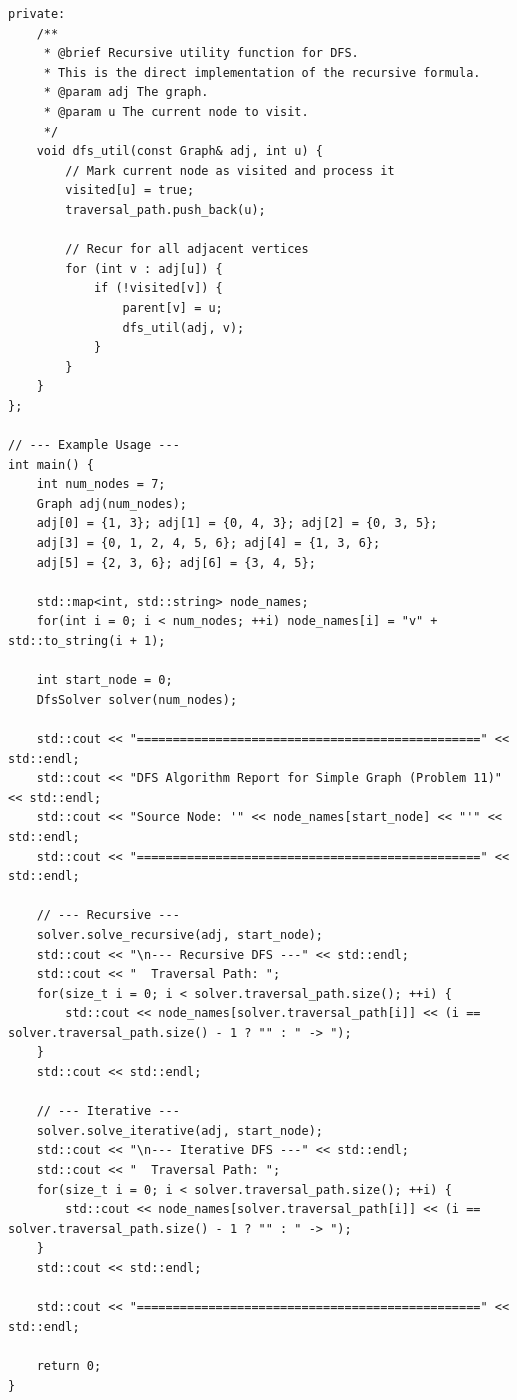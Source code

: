 \documentclass[a4paper,12pt]{article}
\begin{document}
\begin{lstlisting}[style=cppstyle, caption={Cài đặt DFS cho đơn đồ thị trong C++ (cả đệ quy và lặp).}, label={lst:cpp_dfs_11}]
private:
    /**
     * @brief Recursive utility function for DFS.
     * This is the direct implementation of the recursive formula.
     * @param adj The graph.
     * @param u The current node to visit.
     */
    void dfs_util(const Graph& adj, int u) {
        // Mark current node as visited and process it
        visited[u] = true;
        traversal_path.push_back(u);

        // Recur for all adjacent vertices
        for (int v : adj[u]) {
            if (!visited[v]) {
                parent[v] = u;
                dfs_util(adj, v);
            }
        }
    }
};

// --- Example Usage ---
int main() {
    int num_nodes = 7;
    Graph adj(num_nodes);
    adj[0] = {1, 3}; adj[1] = {0, 4, 3}; adj[2] = {0, 3, 5};
    adj[3] = {0, 1, 2, 4, 5, 6}; adj[4] = {1, 3, 6};
    adj[5] = {2, 3, 6}; adj[6] = {3, 4, 5};

    std::map<int, std::string> node_names;
    for(int i = 0; i < num_nodes; ++i) node_names[i] = "v" + std::to_string(i + 1);
    
    int start_node = 0;
    DfsSolver solver(num_nodes);

    std::cout << "================================================" << std::endl;
    std::cout << "DFS Algorithm Report for Simple Graph (Problem 11)" << std::endl;
    std::cout << "Source Node: '" << node_names[start_node] << "'" << std::endl;
    std::cout << "================================================" << std::endl;
    
    // --- Recursive ---
    solver.solve_recursive(adj, start_node);
    std::cout << "\n--- Recursive DFS ---" << std::endl;
    std::cout << "  Traversal Path: ";
    for(size_t i = 0; i < solver.traversal_path.size(); ++i) {
        std::cout << node_names[solver.traversal_path[i]] << (i == solver.traversal_path.size() - 1 ? "" : " -> ");
    }
    std::cout << std::endl;

    // --- Iterative ---
    solver.solve_iterative(adj, start_node);
    std::cout << "\n--- Iterative DFS ---" << std::endl;
    std::cout << "  Traversal Path: ";
    for(size_t i = 0; i < solver.traversal_path.size(); ++i) {
        std::cout << node_names[solver.traversal_path[i]] << (i == solver.traversal_path.size() - 1 ? "" : " -> ");
    }
    std::cout << std::endl;

    std::cout << "================================================" << std::endl;

    return 0;
}
\end{lstlisting}
\end{document}
